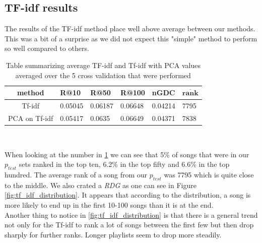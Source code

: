 \subsection{TF-idf results}\label{ssec:tf_idf_results}

The results of the TF-idf method place well above average between our methods. This was a bit of a surprise as we did not expect this "simple" method to perform so well compared to others. \\

\begin{table}[h]
\centering
\renewcommand{\arraystretch}{1.5}
\begin{tabu} to 1\textwidth {| c || X[c] | X[c] | X[c] | X[c] | X[c] | }
 \hline
 \textbf{method} & \textbf{R@10} & \textbf{R@50} & \textbf{R@100} & \textbf{nGDC} & $ \boldsymbol{\overline{rank}} $ \\
 \hline
 \hline
 Tf-idf & 0.05045 & 0.06187 & 0.06648 & 0.04214 & 7795 \\
 \hline
 PCA on Tf-idf & 0.05417 & 0.0635 & 0.06649 & 0.04371 & 7838 \\
 \hline
\end{tabu} \\
\caption{Table summarizing average TF-idf and Tf-idf with PCA values averaged over the 5 cross validation that were performed}
\label{table:1}
\end{table}

When looking at the number in \ref{table:1} we can see that 5\% of songs that were in our $p_{test}$ sets ranked in the top ten, 6.2\% in the top fifty and 6.6\% in the top hundred. The average rank of a song from our $p_{test}$ was 7795 which is quite close to the middle. We also crated a \textit{RDG} as one can see in Figure \ref{fig:tf_idf_distribution}. It appears that according to the distribution, a song is more likely to end up in the first 10-100 songs than it is at the end.\\
Another thing to notice in \ref{fig:tf_idf_distribution} is that there is a general trend not only for the Tf-idf to rank a lot of songs between the first few but then drop sharply for further ranks. Longer playlists seem to drop more steadily.

